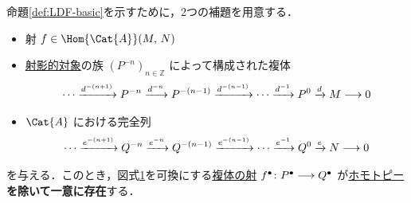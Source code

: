 \documentclass[algtopo_main]{subfiles}
\begin{document}
命題\ref{def:LDF-basic}を示すために，2つの補題を用意する．
\hrulefill
\begin{mylem}[label=lem:LDF-1]{}
    \begin{itemize}
        \item  射 $f \in \Hom{\Cat{A}}(M,\, N)$
        \item \hyperref[def:proj-mod]{射影的対象}の族 $(P^{-n})_{n \in \mathbb{Z}}$ によって構成された複体
        \begin{align}
            \cdots \xrightarrow{d^{-(n+1)}} P^{-n} \xrightarrow{d^{-n}} P^{-(n-1)} \xrightarrow{d^{-(n-1)}} \cdots \xrightarrow{d^{-1}} P^{0} \xrightarrow{d} M \longrightarrow 0
        \end{align}
        \item $\Cat{A}$ における完全列
        \begin{align}
            \cdots \xrightarrow{e^{-(n+1)}} Q^{-n} \xrightarrow{e^{-n}} Q^{-(n-1)} \xrightarrow{e^{-(n-1)}} \cdots \xrightarrow{e^{-1}} Q^{0} \xrightarrow{e} N \longrightarrow 0
        \end{align}
    \end{itemize}
    を与える．このとき，図式\ref{cmtd:LDF-1}を可換にする\hyperref[def:chain-morphism]{複体の射} $f^\bullet \colon P^\bullet \longrightarrow Q^\bullet$ が\hyperref[def:chain-homotopy]{ホモトピー}\textbf{を除いて一意に存在}する．
\end{mylem}

\begin{figure}[H]
    \centering
    \caption{}
    \label{cmtd:LDF-1}
\end{figure}%
\end{document}
